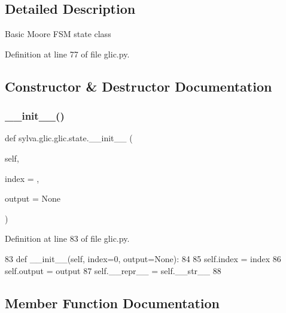 \subsection{Detailed Description}
\begin{DoxyVerb}  Basic Moore FSM state class
\end{DoxyVerb}
 

Definition at line 77 of file glic.\+py.



\subsection{Constructor \& Destructor Documentation}
\mbox{\label{classsylva_1_1glic_1_1glic_1_1state_a0f4333a285db0815af061030147719bc}} 
\subsubsection{\texorpdfstring{\+\_\+\+\_\+init\+\_\+\+\_\+()}{\_\_init\_\_()}}
{\footnotesize\ttfamily def sylva.\+glic.\+glic.\+state.\+\_\+\+\_\+init\+\_\+\+\_\+ (\begin{DoxyParamCaption}\item[{}]{self,  }\item[{}]{index = {},  }\item[{}]{output = {\ttfamily None} }\end{DoxyParamCaption})}



Definition at line 83 of file glic.\+py.


\begin{DoxyCode}
83     \textcolor{keyword}{def }\_\_init\_\_(self, index=0, output=None):
84 
85       self.index = index
86       self.output = output
87       self.\_\_repr\_\_ = self.\_\_str\_\_
88 
\end{DoxyCode}


\subsection{Member Function Documentation}
\mbox{\label{classsylva_1_1glic_1_1glic_1_1state_ae76daa7ee7736520b44faadbe0cd0b39}} 
